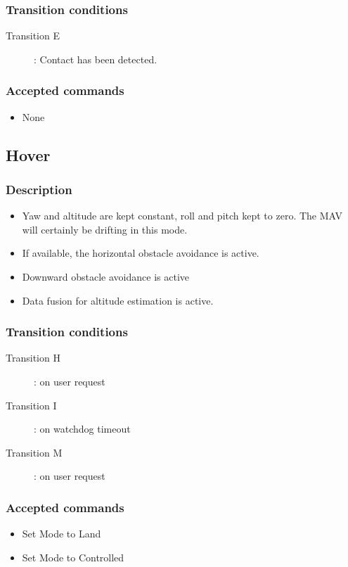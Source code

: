 \documentclass{article}
\begin{document}
\subsubsection{Transition conditions}
\begin{description}
\item[Transition E]: Contact has been detected.
\end{description}
\subsubsection{Accepted commands}
\begin{itemize}
\item None
\end{itemize}

\subsection{Hover}
\subsubsection{Description}
\begin{itemize}
\item Yaw and altitude are kept constant, roll and pitch kept to zero. The MAV
will certainly be drifting in this mode.
\item If available, the horizontal obstacle avoidance is active.
\item Downward obstacle avoidance is active
\item Data fusion for altitude estimation is active. 
\end{itemize}
\subsubsection{Transition conditions}
\begin{description}
\item[Transition H]: on user request
\item[Transition I]: on watchdog timeout
\item[Transition M]: on user request
\end{description}
\subsubsection{Accepted commands}
\begin{itemize}
\item Set Mode to Land
\item Set Mode to Controlled
\end{itemize}
\end{document}
